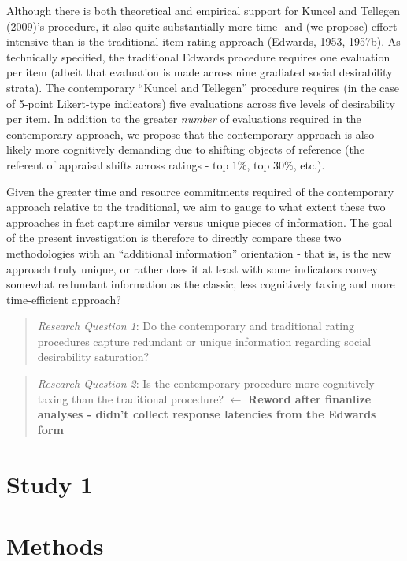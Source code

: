 \documentclass[
  ,jou]{apa6}
\begin{document}
Although there is both theoretical and empirical support for Kuncel and Tellegen (2009)'s procedure, it also quite substantially more time- and (we propose) effort-intensive than is the traditional item-rating approach (Edwards, 1953, 1957b). As technically specified, the traditional Edwards procedure requires one evaluation per item (albeit that evaluation is made across nine gradiated social desirability strata). The contemporary ``Kuncel and Tellegen'' procedure requires (in the case of 5-point Likert-type indicators) five evaluations across five levels of desirability per item. In addition to the greater \emph{number} of evaluations required in the contemporary approach, we propose that the contemporary approach is also likely more cognitively demanding due to shifting objects of reference (the referent of appraisal shifts across ratings - top 1\%, top 30\%, etc.).

Given the greater time and resource commitments required of the contemporary approach relative to the traditional, we aim to gauge to what extent these two approaches in fact capture similar versus unique pieces of information. The goal of the present investigation is therefore to directly compare these two methodologies with an ``additional information'' orientation - that is, is the new approach truly unique, or rather does it at least with some indicators convey somewhat redundant information as the classic, less cognitively taxing and more time-efficient approach?

\begin{quote}
\emph{Research Question 1}: Do the contemporary and traditional rating procedures capture redundant or unique information regarding social desirability saturation?
\end{quote}

\begin{quote}
\emph{Research Question 2}: Is the contemporary procedure more cognitively taxing than the traditional procedure? \(\leftarrow\) \textbf{Reword after finanlize analyses - didn't collect response latencies from the Edwards form}
\end{quote}

\hypertarget{study-1}{%
\section{Study 1}\label{study-1}}

\hypertarget{methods}{%
\section{Methods}\label{methods}}
\end{document}
